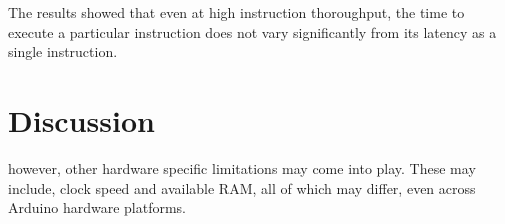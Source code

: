  The results showed that even at high instruction thoroughput, the time to execute a particular instruction does not vary significantly from its latency as a single instruction.


\section{Discussion} %
\label{sec:Discussion}

 however, other hardware specific limitations may come into play. These may include, clock speed and available RAM, all of which may differ, even across Arduino hardware platforms.

